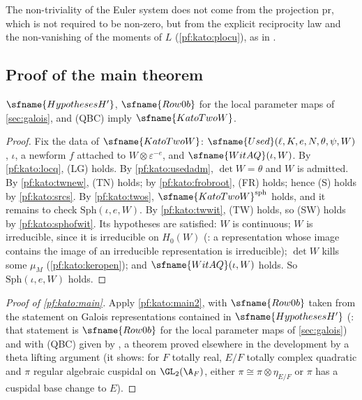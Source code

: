 \begin{remark}
The non-triviality of the Euler system does not come from the projection $\mathrm{pr}$, which is not required to be non-zero, but from the
explicit reciprocity law and the non-vanishing of the moments of $L$ (\cref{pf:kato:plocu}), as in \cite{Kato2004}.
\end{remark}

\subsection{Proof of the main theorem}\label{pf:kato:sec:proof}

\begin{theorem}\label{pf:kato:main2}
$\sfname{HypothesesH'}$, $\sfname{Row0b}$ for the local parameter maps of \cref{sec:galois}, and \textup{(QBC)} imply
$\sfname{KatoTwoW}$.
\end{theorem}

\begin{proof}
Fix the data of $\sfname{KatoTwoW}$: $\sfname{Used}(\ell,K,e,N,\theta,\psi,W)$, $\iota$, a newform $f$ attached to $W\otimes\varepsilon^{-e}$,
and $\sfname{WitAQ}(\iota,W)$. By \cref{pf:kato:locq}, \textup{(LG)} holds. By \cref{pf:kato:usedadm}, $\det W=\theta$ and $W$ is admitted.
By \cref{pf:kato:twnew}, \textup{(TN)} holds; by \cref{pf:kato:frobroot}, \textup{(FR)} holds; hence \textup{(S)} holds by
\cref{pf:kato:srcs}. By \cref{pf:kato:twos}, $\sfname{KatoTwoW}^{\mathrm{sph}}$ holds, and it remains to check $\mathrm{Sph}(\iota,e,W)$. By
\cref{pf:kato:twwit}, \textup{(TW)} holds, so \textup{(SW)} holds by \cref{pf:kato:sphofwit}. Its hypotheses are satisfied: $W$ is
continuous; $W$ is irreducible, since it is irreducible on $H_0(W)$ (: a
representation whose image contains the image of an irreducible representation is irreducible); $\det W$ kills some $\mu_M$
(\cref{pf:kato:keropen}); and $\sfname{WitAQ}(\iota,W)$ holds. So $\mathrm{Sph}(\iota,e,W)$ holds.
\end{proof}

\begin{proof}[Proof of \cref{pf:kato:main}]
Apply \cref{pf:kato:main2}, with $\sfname{Row0b}$ taken from the statement on Galois representations contained in
$\sfname{HypothesesH'}$ (: that statement is $\sfname{Row0b}$ for the local parameter maps of
\cref{sec:galois}) and with \textup{(QBC)} given by , a theorem proved
elsewhere in the development by a theta lifting argument (it shows: for $F$ totally real, $E/F$ totally complex quadratic and
$\pi$ regular algebraic cuspidal on $\GL_2(\A_F)$, either $\pi\cong\pi\otimes\eta_{E/F}$ or $\pi$ has a cuspidal base change to $E$).
\end{proof}

